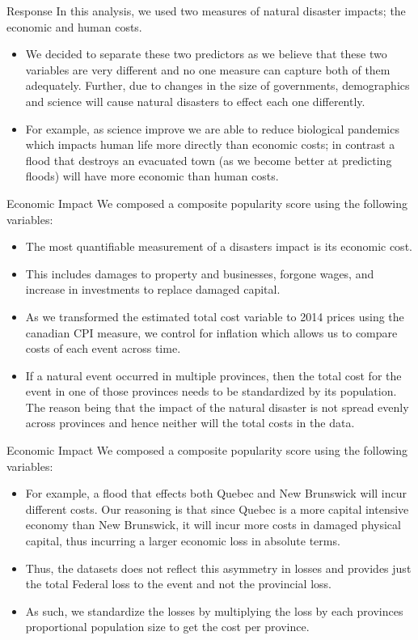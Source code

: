 \begin{frame}{Response}
	In this analysis, we used two measures of natural disaster impacts; the economic and human costs.
\begin{itemize}
	\item We decided to separate these two predictors as we believe that these two variables are very different and no one measure can capture both of them adequately. Further, due to changes in the size of governments, demographics and science will cause natural disasters to effect each one differently. 
	\item For example, as science improve we are able to reduce biological pandemics which impacts human life more directly than economic costs; in contrast a flood that destroys an evacuated town (as we become better at predicting floods) will have more economic than human costs.

\end{itemize}
\end{frame}

\begin{frame}{Economic Impact}
We composed a composite popularity score using the following variables:
\begin{itemize}
\item The most quantifiable measurement of a disasters impact is its economic cost.
\item This includes damages to property and businesses, forgone wages, and increase in investments to replace damaged capital.
\item  As we transformed the estimated total cost variable to 2014 prices using the canadian CPI measure, we control for inflation which allows us to compare costs of each event across time.
\item If a natural event occurred in multiple provinces, then the total cost for the event in one of those provinces needs to be standardized by its population. The reason being that the impact of the natural disaster is not spread evenly across provinces and hence neither will the total costs in the data.

\end{itemize}
\end{frame}

\begin{frame}{Economic Impact}
We composed a composite popularity score using the following variables:
\begin{itemize}
	\item For example, a flood that effects both Quebec and New Brunswick will incur different costs. Our reasoning is that since Quebec is a more capital intensive economy than New Brunswick, it will incur more costs in damaged physical capital, thus incurring a larger economic loss in absolute terms.
	\item Thus, the datasets does not reflect this asymmetry in losses and provides just the total Federal loss to the event and not the provincial loss.
	\item As such, we standardize the losses by multiplying the loss by each provinces proportional population size to get the cost per province.
\end{itemize}
\end{frame}

